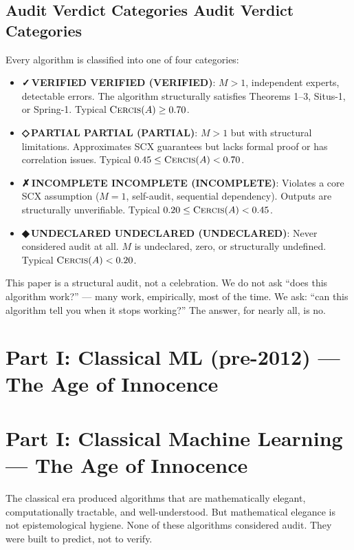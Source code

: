\documentclass[12pt,a4paper]{article}
\theoremstyle{definition}
\newcommand{\guilty}{{\color{guiltycolor}\textbf{◆\,UNDECLARED}}}
\newcommand{\weakness}{{\color{weakcolor}\textbf{◇\,PARTIAL}}}
\newcommand{\verified}{{\color{verifiedcolor}\textbf{✓\,VERIFIED}}}
\newcommand{\fail}{{\color{guiltycolor}\textbf{✗\,INCOMPLETE}}}
\newcommand{\Cercis}{\textsc{Cercis}}
\newcommand{\SCX}{\textsc{SCX}}
\begin{document}
\subsection{Audit Verdict Categories Audit Verdict Categories}

Every algorithm is classified into one of four categories:

\begin{itemize}[nosep]
    \item \textbf{\verified{} VERIFIED (VERIFIED)}: $M > 1$, independent experts, detectable errors. The algorithm structurally satisfies Theorems 1--3, Situs-1, or Spring-1. Typical $\Cercis(A) \ge 0.70$.
    \item \textbf{\weakness{} PARTIAL (PARTIAL)}: $M > 1$ but with structural limitations. Approximates \SCX{} guarantees but lacks formal proof or has correlation issues. Typical $0.45 \le \Cercis(A) < 0.70$.
    \item \textbf{\fail{} INCOMPLETE (INCOMPLETE)}: Violates a core \SCX{} assumption ($M=1$, self-audit, sequential dependency). Outputs are structurally unverifiable. Typical $0.20 \le \Cercis(A) < 0.45$.
    \item \textbf{\guilty{} UNDECLARED (UNDECLARED)}: Never considered audit at all. $M$ is undeclared, zero, or structurally undefined. Typical $\Cercis(A) < 0.20$.
\end{itemize}

This paper is a structural audit, not a celebration. We do not ask ``does this algorithm work?'' — many work, empirically, most of the time. We ask: ``can this algorithm tell you when it stops working?'' The answer, for nearly all, is no.

\section{Part I: Classical ML (pre-2012) — The Age of Innocence}
\section{Part I: Classical Machine Learning --- The Age of Innocence}
\label{sec:classical}

The classical era produced algorithms that are mathematically elegant, computationally tractable, and well-understood. But mathematical elegance is not epistemological hygiene. None of these algorithms considered audit. They were built to predict, not to verify.
\end{document}
